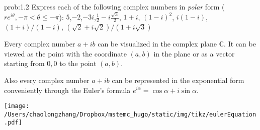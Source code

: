 \documentclass[koma,a4paper,utopia,12pt,listings-color,microtype,paralist,colorlinks,urlcolor=red]{org-article}
\begin{document}
\begin{prob}[]{prob:1.2}
Express each of the following complex numbers in \emph{polar} form (\(re^{i\theta},
-\pi < \theta \leq -\pi\)): \(5\),\(-2\),\(-3i\),\(\frac{1}{2} -
i\frac{\sqrt{3}}{2}\), \(1 + i\), \((1-i)^{2}\), \(i(1-i)\), \((1+i)/(1-i)\), \((\sqrt{2} +i\sqrt{2})/ (1 +i\sqrt{3})\)
\label{prob:1.2}
\end{prob}


Every complex number \(a+ib\) can be visualized in the complex plane
\(\mathbb{C}\). It can be viewed as the point with the coordinate \((a,b)\) in
the plane or as a vector starting from \(0,0\) to the point \((a,b)\).

Also every complex number \(a+ib\) can be represented in the exponential form
conveniently through the Euler's formula \(e^{i\alpha} = \cos\alpha +
i\sin\alpha\).

\begin{center}
\texttt{[image: /Users/chaolongzhang/Dropbox/mstemc\_hugo/static/img/tikz/eulerEquation.pdf]}
\end{center}
\end{document}
